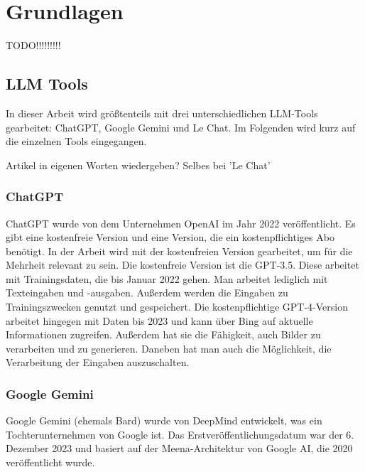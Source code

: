 
\chapter{Grundlagen} 

TODO!!!!!!!!!

\section{LLM Tools}  \label{LLM Tools}

In dieser Arbeit wird größtenteils mit drei unterschiedlichen LLM-Tools gearbeitet: ChatGPT, Google Gemini und  
Le Chat. Im Folgenden wird kurz auf die einzelnen Tools eingegangen.


Artikel in eigenen Worten wiedergeben? Selbes bei 'Le Chat'

\subsection{ChatGPT}  \label{ChatGPT}

ChatGPT wurde von dem Unternehmen OpenAI im Jahr 2022 veröffentlicht. Es gibt eine kostenfreie Version und  
eine Version, die ein kostenpflichtiges Abo benötigt. In der Arbeit wird mit der kostenfreien Version gearbeitet,  
um für die Mehrheit relevant zu sein. Die kostenfreie Version ist die GPT-3.5. Diese arbeitet mit Trainingsdaten,  
die bis Januar 2022 gehen. Man arbeitet lediglich mit Texteingaben und -ausgaben. Außerdem werden die Eingaben  
zu Trainingszwecken genutzt und gespeichert. Die kostenpflichtige GPT-4-Version arbeitet hingegen mit Daten  
bis 2023 und kann über Bing auf aktuelle Informationen zugreifen. Außerdem hat sie die Fähigkeit, auch Bilder  
zu verarbeiten und zu generieren. Daneben hat man auch die Möglichkeit, die Verarbeitung der Eingaben auszuschalten. 

\subsection{Google Gemini}  \label{Google Gemini}

Google Gemini (ehemals Bard) wurde von DeepMind entwickelt, was ein Tochterunternehmen von Google ist.  
Das Erstveröffentlichungsdatum war der 6. Dezember 2023 und basiert auf der Meena-Architektur von Google AI,  
die 2020 veröffentlicht wurde.

